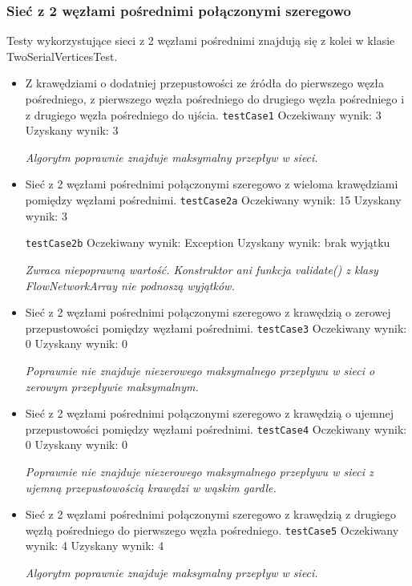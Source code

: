 \subsubsection{Sieć z 2 węzłami pośrednimi połączonymi szeregowo}
Testy wykorzystujące sieci z 2 węzłami pośrednimi znajdują się z kolei w klasie
TwoSerialVerticesTest.
\begin{itemize}[nosep]
    \item Z krawędziami o dodatniej przepustowości ze źródła do pierwszego węzła
    pośredniego, z pierwszego węzła pośredniego do drugiego węzła pośredniego i z
    drugiego węzła pośredniego do ujścia.
    \texttt{testCase1}
    Oczekiwany wynik: 3
    Uzyskany wynik: 3

    \emph{Algorytm poprawnie znajduje maksymalny przepływ w sieci.}

    \item Sieć z 2 węzłami pośrednimi połączonymi szeregowo z wieloma
    krawędziami pomiędzy węzłami pośrednimi.
    \texttt{testCase2a}
    Oczekiwany wynik: 15
    Uzyskany wynik: 3

    \texttt{testCase2b}
    Oczekiwany wynik: Exception
    Uzyskany wynik: brak wyjątku

    \emph{Zwraca niepoprawną wartość. Konstruktor ani funkcja validate() z klasy FlowNetworkArray nie podnoszą wyjątków.}

    \item Sieć z 2 węzłami pośrednimi połączonymi szeregowo z krawędzią o
    zerowej przepustowości pomiędzy węzłami pośrednimi.
    \texttt{testCase3}
    Oczekiwany wynik: 0
    Uzyskany wynik: 0

    \emph{Poprawnie nie znajduje niezerowego maksymalnego przepływu w sieci o zerowym przepływie maksymalnym.}

    \item Sieć z 2 węzłami pośrednimi połączonymi szeregowo z krawędzią o
    ujemnej przepustowości pomiędzy węzłami pośrednimi.
    \texttt{testCase4}
    Oczekiwany wynik: 0
    Uzyskany wynik: 0

    \emph{Poprawnie nie znajduje niezerowego maksymalnego przepływu w sieci z ujemną przepustowością krawędzi w wąskim gardle.}

    \item Sieć z 2 węzłami pośrednimi połączonymi szeregowo z krawędzią z
    drugiego węzłą pośredniego do pierwszego węzła pośredniego.
    \texttt{testCase5}
    Oczekiwany wynik: 4
    Uzyskany wynik: 4

    \emph{Algorytm poprawnie znajduje maksymalny przepływ w sieci.}


\end{itemize}
